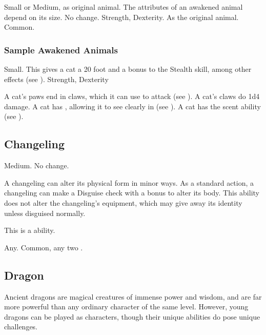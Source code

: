          Small or Medium, as original animal.
         The attributes of an awakened animal depend on its size.
         No change.
          Strength,  Dexterity.
         As the original animal.
         Common.

        \subsubsection{Sample Awakened Animals}


             Small. This gives a cat a 20 foot  and a  bonus to the Stealth skill, among other effects (see ).
              Strength,  Dexterity
            \begin{itemize}
                 A cat's paws end in claws, which it can use to attack (see ). A cat's claws do 1d4 damage.
                 A cat has , allowing it to see clearly in  (see ).
                 A cat has the scent ability (see ).
            \end{itemize}

    \subsection{Changeling}

         Medium.
         No change.
        \begin{itemize}
             A changeling can alter its physical form in minor ways. As a standard action, a changeling can make a Disguise check with a  bonus to alter its body. This ability does not alter the changeling's equipment, which may give away its identity unless disguised normally.

            This is a \magical ability.
        \end{itemize}
         Any.
         Common, any two .

    \subsection{Dragon}
        Ancient dragons are magical creatures of immense power and wisdom, and are far more powerful than any ordinary character of the same level.
        However, young dragons can be played as characters, though their unique abilities do pose unique challenges.

